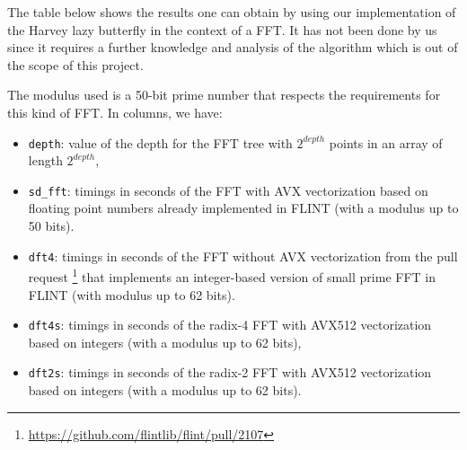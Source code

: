\documentclass[a4paper]{article}
\begin{document}
The table below shows the results one can obtain by using our implementation of the Harvey lazy butterfly
in the context of a FFT.
It has not been done by us since it requires a further knowledge and analysis of the algorithm
which is out of the scope of this project.

\bigskip
The modulus used is a 50-bit prime number that respects the requirements for this kind of FFT.
In columns, we have:
\begin{itemize}
    \item \texttt{depth}: value of the depth for the FFT tree with $2^{depth}$ points
    in an array of length $2^{depth}$,
    \item \texttt{sd\_fft}: timings in seconds of the FFT with AVX vectorization based on floating point numbers
    already implemented in FLINT (with a modulus up to 50 bits).
    \item \texttt{dft4}: timings in seconds of the FFT without AVX vectorization from the pull request
    \footnote{\url{https://github.com/flintlib/flint/pull/2107}} that implements an integer-based 
    version of small prime FFT in FLINT (with modulus up to 62 bits).    
    \item \texttt{dft4s}: timings in seconds of the radix-4 FFT with AVX512 vectorization based on integers (with a modulus up to 62 bits),
    \item \texttt{dft2s}: timings in seconds of the radix-2 FFT with AVX512 vectorization based on integers (with a modulus up to 62 bits).
\end{itemize}
\end{document}

